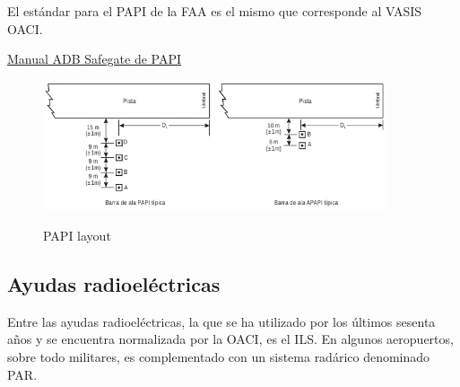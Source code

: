 \begin{tcolorbox}[title = {Lente de Fresnel}
  ]
\end{tcolorbox}



El estándar para el PAPI de la FAA es el mismo que corresponde al VASIS OACI.

\href{https://adbsafegate.com/documents/2116/en/manual-voltage-powered-papi}{Manual ADB Safegate de PAPI}


\begin{figure}[!htb]
  \centering
    \includegraphics[width=0.9\textwidth]{06.radionavegacion/Imagenes/06.PAPI/PapiLayoutOACI.pdf}
    \label{fig:PAPI.layout}
  \caption{PAPI layout \protect\cite{Anexo14Vol1} }
\end{figure}



\subsection{Ayudas radioeléctricas}
\label{sec:06.03.ayudas.radioelectricas}

Entre las ayudas radioeléctricas, la que se ha utilizado por los últimos sesenta años y se encuentra
normalizada por la OACI, es el ILS. En algunos aeropuertos, sobre todo militares, es complementado
con un sistema radárico denominado PAR.


